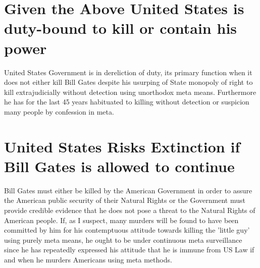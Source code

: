 \documentclass{amsart}
\begin{document}
\section{Given the Above United States is duty-bound to kill or contain his power}

United States Government is in dereliction of duty, its primary function when it does not either kill Bill Gates despite his usurping of State monopoly of right to kill extrajudicially without detection using unorthodox meta means.  Furthermore he has for the last 45 years habituated to killing without detection or suspicion many people by confession in meta.  

\section{United States Risks Extinction if Bill Gates is allowed to continue}

Bill Gates must either be killed by the American Government in order to assure the American public security of their Natural Rights or the Government must provide credible evidence that he does not pose a threat to the Natural Rights of American people.  If, as I suspect, many murders will be found to have been committed by him for his contemptuous attitude towards killing the 'little guy' using purely meta means, he ought to be under continuous meta surveillance since he has repeatedly expressed his attitude that he is immune from US Law if and when he murders Americans using meta methods.
\end{document}
